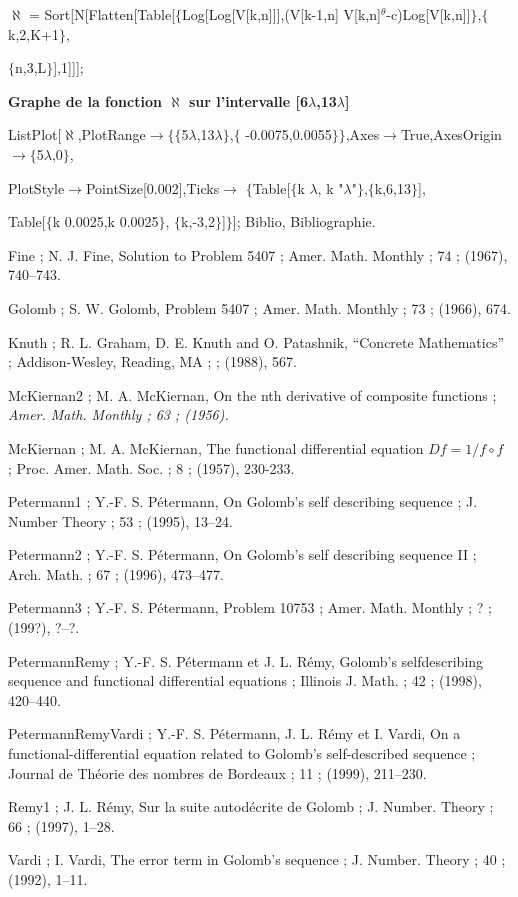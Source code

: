 \noindent
$\aleph$ = Sort[N[Flatten[Table[$\{$Log[Log[V[k,n]]],(V[k-1,n] V[k,n]$^{\theta}$-c)Log[V[k,n]]$\}$,$\{$k,2,K+1$\}$,

\noindent
$\{$n,3,L$\}$],1]]];
\medskip

\noindent
{\bf
Graphe de la fonction $\aleph$ sur l'intervalle [6$\lambda$,13$\lambda$]
}
\medskip

\noindent
ListPlot[$\aleph$,PlotRange$\rightarrow\{\{$5$\lambda$,13$\lambda\}$,$\{$
-0.0075,0.0055$\}\}$,Axes$\rightarrow$True,AxesOrigin$\rightarrow\{$5$\lambda$,0$\}$,

\noindent
PlotStyle$\rightarrow$PointSize[0.002],Ticks$\rightarrow$
$\{$Table[$\{$k $\lambda$, k "$\lambda$"$\}$,$\{$k,6,13$\}$],

\noindent
Table[$\{$k 0.0025,k 0.0025$\}$,
$\{$k,-3,2$\}$]$\}$];
\bigskip
\hfill\eject
\Secti Biblio, Bibliographie.

{\eightpts
\DefRef Fine ; N. J. Fine, Solution to Problem 5407 ; Amer. Math. Monthly ; 74 ; (1967), 740--743.

\DefRef Golomb ; S. W. Golomb, Problem 5407 ; Amer. Math. Monthly ; 73 ; (1966), 674.

\DefRef Knuth ; R. L. Graham, D. E. Knuth and O. Patashnik, ``Concrete Mathematics'' ; Addison-Wesley, Reading, MA ; { } ; $\!\!$(1988), 567.

\DefRef McKiernan2 ; M. A. McKiernan, On the nth derivative of composite functions ; \it Amer. Math. Monthly ; 63 ; (1956).

\DefRef McKiernan ; M. A. McKiernan, The functional differential equation $Df=1/f\circ f$ ; Proc. Amer. Math. Soc. ; 8 ; (1957), 230-233.

\DefRef Petermann1 ; Y.-F. S. P\'etermann, On Golomb's self describing sequence ; J. Number Theory ; 53 ; (1995), 13--24.

\DefRef Petermann2 ; Y.-F. S. P\'etermann, On Golomb's self describing sequence II ; Arch. Math. ; 67 ; (1996), 473--477.

\DefRef Petermann3 ; Y.-F. S. P\'etermann, Problem 10753 ; Amer. Math. Monthly ; ? ; (199?), ?--?.

\DefRef PetermannRemy ; Y.-F. S. P\'etermann et J. L. R\'emy, Golomb's selfdescribing sequence 
and functional differential equations ; Illinois J. Math. ; 42 ; (1998), 420--440.

\DefRef PetermannRemyVardi ; Y.-F. S. P\'etermann, J. L. R\'emy et I. Vardi, On a functional-differential equation related 
to Golomb's self-described sequence ; Journal de Th\'eorie des nombres de Bordeaux ; 11 ; (1999), 211--230.

\DefRef Remy1 ; J. L. R\'emy, Sur la suite autod\'ecrite de Golomb ; J. Number. Theory ; 66 ; (1997), 1--28.

\DefRef Vardi ; I. Vardi, The error term in Golomb's sequence ; J. Number. Theory ; 40 ; (1992), 1--11.
\par
}
\bye









